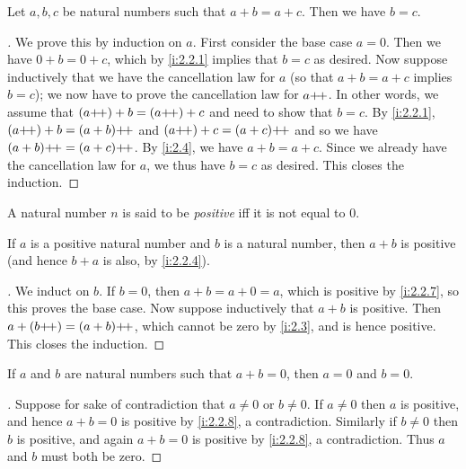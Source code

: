 \begin{prop}\label{i:2.2.6}
  Let \(a, b, c\) be natural numbers such that \(a + b = a + c\).
  Then we have \(b = c\).
\end{prop}

\begin{proof}[]
  We prove this by induction on \(a\).
  First consider the base case \(a = 0\).
  Then we have \(0 + b = 0 + c\), which by \cref{i:2.2.1} implies that \(b = c\) as desired.
  Now suppose inductively that we have the cancellation law for \(a\) (so that \(a + b = a + c\) implies \(b = c\));
  we now have to prove the cancellation law for \(a{+}\!{+}\).
  In other words, we assume that \((a{+}\!{+}) + b = (a{+}\!{+}) + c\) and need to show that \(b = c\).
  By \cref{i:2.2.1}, \((a{+}\!{+}) + b = (a + b){+}\!{+}\) and \((a{+}\!{+}) + c = (a + c){+}\!{+}\) and so we have \((a + b){+}\!{+} = (a + c){+}\!{+}\).
  By \cref{i:2.4}, we have \(a + b = a + c\).
  Since we already have the cancellation law for \(a\), we thus have \(b = c\) as desired.
  This closes the induction.
\end{proof}

\begin{defn}\label{i:2.2.7}
  A natural number \(n\) is said to be \emph{positive} iff it is not equal to \(0\).
\end{defn}

\begin{prop}\label{i:2.2.8}
  If \(a\) is a positive natural number and \(b\) is a natural number, then \(a + b\) is positive (and hence \(b + a\) is also, by \cref{i:2.2.4}).
\end{prop}

\begin{proof}[]
  We induct on \(b\).
  If \(b = 0\), then \(a + b = a + 0 = a\), which is positive by \cref{i:2.2.7}, so this proves the base case.
  Now suppose inductively that \(a + b\) is positive.
  Then \(a + (b{+}\!{+}) = (a + b){+}\!{+}\), which cannot be zero by \cref{i:2.3}, and is hence positive.
  This closes the induction.
\end{proof}

\begin{cor}\label{i:2.2.9}
  If \(a\) and \(b\) are natural numbers such that \(a + b = 0\), then \(a = 0\) and \(b = 0\).
\end{cor}

\begin{proof}[]
  Suppose for sake of contradiction that \(a \neq 0\) or \(b \neq 0\).
  If \(a \neq 0\) then \(a\) is positive, and hence \(a + b = 0\) is positive by \cref{i:2.2.8}, a contradiction.
  Similarly if \(b \neq 0\) then \(b\) is positive, and again \(a + b = 0\) is positive by \cref{i:2.2.8}, a contradiction.
  Thus \(a\) and \(b\) must both be zero.
\end{proof}

